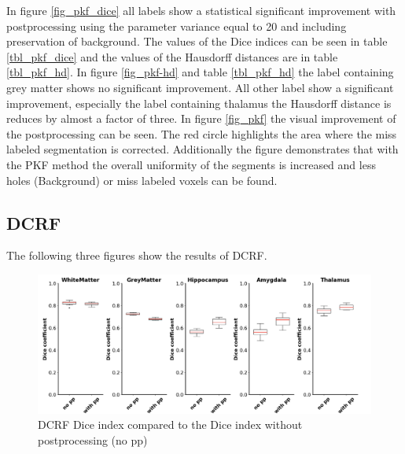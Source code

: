 \documentclass[journal]{IEEEtran}
\begin{document}
In figure \ref{fig_pkf_dice} all labels show a statistical significant improvement with postprocessing using the parameter variance equal to 20 and including preservation of background. The values of the Dice indices can be seen in table \ref{tbl_pkf_dice} and the values of the Hausdorff distances are in table \ref{tbl_pkf_hd}.
In figure \ref{fig_pkf-hd} and table \ref{tbl_pkf_hd} the label containing grey matter shows no significant improvement. All other label show a significant improvement, especially the label containing thalamus the Hausdorff distance is reduces by almost a factor of three.
In figure \ref{fig_pkf} the visual improvement of the postprocessing can be seen. The red circle highlights the area where the miss labeled segmentation is corrected. Additionally the figure demonstrates that with the PKF method the overall uniformity of the segments is increased and less holes (Background) or miss labeled voxels can be found.

\subsection{DCRF}
The following three figures show the results of DCRF.
\begin{figure}[ht]
\centering
\includegraphics[width=\textwidth]{MIALab_Report/img/boxplots/DCRF-DICE.png}
\caption{DCRF Dice index compared to the Dice index without postprocessing (no pp)}
\label{fig_dcrf_dice}
\end{figure}
\end{document}
